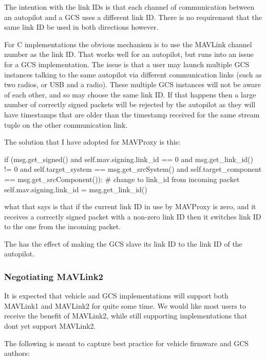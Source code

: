 The intention with the link I\+Ds is that each channel of communication between an autopilot and a G\+CS uses a different link ID. There is no requirement that the same link ID be used in both directions however.

For C implementations the obvious mechanism is to use the M\+A\+V\+Link channel number as the link ID. That works well for an autopilot, but runs into an issue for a G\+CS implementation. The issue is that a user may launch multiple G\+CS instances talking to the same autopilot via different communication links (such as two radios, or U\+SB and a radio). These multiple G\+CS instances will not be aware of each other, and so may choose the same link ID. If that happens then a large number of correctly signed packets will be rejected by the autopilot as they will have timestamps that are older than the timestamp received for the same stream tuple on the other communication link.

The solution that I have adopted for M\+A\+V\+Proxy is this\+:


\begin{DoxyCode}
if (msg.get\_signed() and
    self.mav.signing.link\_id == 0 and
    msg.get\_link\_id() != 0 and
    self.target\_system == msg.get\_srcSystem() and
    self.target\_component == msg.get\_srcComponent()):
    # change to link\_id from incoming packet
    self.mav.signing.link\_id = msg.get\_link\_id()
\end{DoxyCode}


what that says is that if the current link ID in use by M\+A\+V\+Proxy is zero, and it receives a correctly signed packet with a non-\/zero link ID then it switches link ID to the one from the incoming packet.

The has the effect of making the G\+CS slave its link ID to the link ID of the autopilot.

\subsubsection*{Negotiating M\+A\+V\+Link2}

It is expected that vehicle and G\+CS implementations will support both M\+A\+V\+Link1 and M\+A\+V\+Link2 for quite some time. We would like most users to receive the benefit of M\+A\+V\+Link2, while still supporting implementations that don\textquotesingle{}t yet support M\+A\+V\+Link2.

The following is meant to capture best practice for vehicle firmware and G\+CS authors\+:


